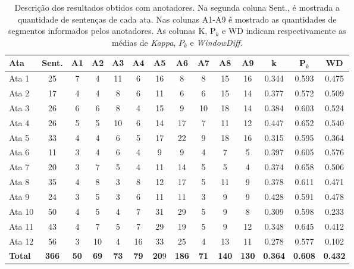 \begin{table}[!h]
	\centering
	\begin{tabular}{|l|c|c|c|c|c|c|c|c|c|c|c|c|c|} \hline
		\textbf{Ata} & \textbf{Sent.}  & 
		\textbf{A1}  & 
		\textbf{A2}  & 
		\textbf{A3}  & 
		\textbf{A4}  & 
		\textbf{A5}  & 
		\textbf{A6}  & 
		\textbf{A7}  & 
		\textbf{A8}  & 
		\textbf{A9}  &
		\textbf{k}  &
		\textbf{P$_k$}  &
		\textbf{WD}  \\	\hline

		Ata 1  & 25 & 7  & 4  & 11 & 6  & 16 & 8  & 8  & 15 & 16 &  0.344 & 0.593 & 0.475 \\ \hline 
		Ata 2  & 17 & 4  & 4  & 8  & 6  & 11 & 6  & 6  & 15 & 14 &  0.377 & 0.572 & 0.509 \\ \hline 
		Ata 3  & 26 & 6  & 6  & 8  & 4  & 15 & 9  & 10 & 18 & 14 &  0.384 & 0.603 & 0.524 \\ \hline 
		Ata 4  & 26 & 5  & 5  & 10 & 6  & 14 & 17 & 7  & 11 & 12 &  0.447 & 0.652 & 0.540 \\ \hline 
		Ata 5  & 33 & 4  & 4  & 6  & 5  & 17 & 22 & 9  & 18 & 16 &  0.315 & 0.595 & 0.364 \\ \hline 
		Ata 6  & 11 & 3  & 4  & 6  & 4  & 9  & 9  & 4  & 7  &  5 &  0.397 & 0.605 & 0.576 \\ \hline 
		Ata 7  & 20 & 3  & 7  & 5  & 4  & 11 & 14 & 5  & 5  &  4 &  0.374 & 0.658 & 0.506 \\ \hline 
		Ata 8  & 35 & 4  & 8  & 3  & 8  & 12 & 17 & 5  & 11 &  9 &  0.378 & 0.611 & 0.471 \\ \hline 
		Ata 9  & 24 & 3  & 5  & 3  & 6  & 11 & 11 & 3  & 9  &  9 &  0.428 & 0.591 & 0.478 \\ \hline 
		Ata 10 & 50 & 4  & 5  & 4  & 7  & 31 & 29 & 5  & 9  &  8 &  0.309 & 0.598 & 0.233 \\ \hline 
		Ata 11 & 43 & 4  & 7  & 5  & 7  & 29 & 19 & 5  & 9  & 12 &  0.348 & 0.645 & 0.412 \\ \hline 
		Ata 12 & 56 & 3  & 10 & 4  & 16 & 33 & 25 & 4  & 13 & 11 &  0.278 & 0.577 & 0.102 \\ \hline 
		\textbf{Total} &
		\textbf{366} & 
		\textbf{50}&  
		\textbf{69} & 
		\textbf{73}&  
		\textbf{79}&  
		\textbf{20}9 & 
		\textbf{186}&  
		\textbf{71}&  
		\textbf{140}&  
		\textbf{130} & 
		\textbf{0.364} & 
		\textbf{0.608} & 
		\textbf{0.432} \\ \hline 

	\end{tabular}
	\caption{Descrição dos resultados obtidos com anotadores. Na segunda coluna Sent., é mostrada a quantidade de sentenças de cada ata. Nas colunas A1-A9 é mostrado as quantidades de segmentos informados pelos anotadores. As colunas K, P$_k$ e WD indicam respectivamente as médias de \textit{Kappa}, $P_k$ e \textit{WindowDiff}.} 

	\label{tab:ataseanotacoes}
\end{table}



